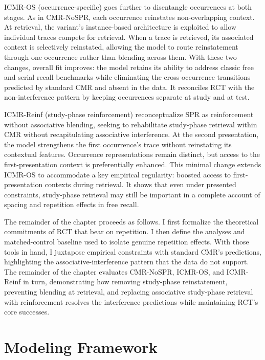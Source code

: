 \documentclass[
  letterpaper,
  11pt,
  english,
  singlespacing,
  headsepline]{MastersDoctoralThesis}
\begin{document}
ICMR-OS (occurrence-specific) goes further to disentangle occurrences at
both stages. As in CMR-NoSPR, each occurrence reinstates non-overlapping
context. At retrieval, the variant's instance-based architecture is
exploited to allow individual traces compete for retrieval. When a trace
is retrieved, its associated context is selectively reinstated, allowing
the model to route reinstatement through one occurrence rather than
blending across them. With these two changes, overall fit improves: the
model retains its ability to address classic free and serial recall
benchmarks while eliminating the cross-occurrence transitions predicted
by standard CMR and absent in the data. It reconciles RCT with the
non-interference pattern by keeping occurrences separate at study and at
test.

ICMR-Reinf (study-phase reinforcement) reconceptualize SPR as
reinforcement without associative blending, seeking to rehabilitate
study-phase retrieval within CMR without recapitulating associative
interference. At the second presentation, the model strengthens the
first occurrence's trace without reinstating its contextual features.
Occurrence representations remain distinct, but access to the
first-presentation context is preferentially enhanced. This minimal
change extends ICMR-OS to accommodate a key empirical regularity:
boosted access to first-presentation contexts during retrieval. It shows
that even under presented constraints, study-phase retrieval may still
be important in a complete account of spacing and repetition effects in
free recall.

The remainder of the chapter proceeds as follows. I first formalize the
theoretical commitments of RCT that bear on repetition. I then define
the analyses and matched-control baseline used to isolate genuine
repetition effects. With those tools in hand, I juxtapose empirical
constraints with standard CMR's predictions, highlighting the
associative-interference pattern that the data do not support. The
remainder of the chapter evaluates CMR-NoSPR, ICMR-OS, and ICMR-Reinf in
turn, demonstrating how removing study-phase reinstatement, preventing
blending at retrieval, and replacing associative study-phase retrieval
with reinforcement resolves the interference predictions while
maintaining RCT's core successes.

\section{Modeling Framework}\label{modeling-framework}
\end{document}
